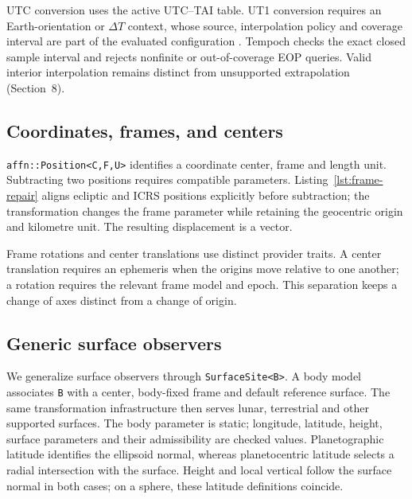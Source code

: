 UTC conversion uses the active UTC--TAI table. UT1 conversion requires an Earth-orientation or
$\Delta T$ context, whose source, interpolation policy and coverage interval are part of the
evaluated configuration \cite{iers2010}. Tempoch checks the exact closed sample interval and
rejects nonfinite or out-of-coverage EOP queries. Valid interior interpolation remains distinct
from unsupported extrapolation (Section~8).

\subsection{Coordinates, frames, and centers}

\texttt{affn::Position<C,F,U>} identifies a coordinate center, frame and length unit. Subtracting
two positions requires compatible parameters. Listing~\ref{lst:frame-repair} aligns ecliptic and
ICRS positions explicitly before subtraction; the transformation changes the frame parameter while
retaining the geocentric origin and kilometre unit. The resulting displacement is a vector.



Frame rotations and center translations use distinct provider traits. A center translation requires
an ephemeris when the origins move relative to one another; a rotation requires the relevant frame
model and epoch. This separation keeps a change of axes distinct from a change of origin.

\subsection{Generic surface observers}
\label{sec:surface}

We generalize surface observers through \texttt{SurfaceSite<B>}. A body model associates \texttt{B}
with a center, body-fixed frame and default reference surface. The same transformation
infrastructure then serves lunar, terrestrial and other supported surfaces. The body parameter is
static; longitude, latitude, height, surface parameters and their admissibility are checked values.
Planetographic latitude identifies the ellipsoid normal, whereas planetocentric latitude selects a
radial intersection with the surface. Height and local vertical follow the surface normal in both
cases; on a sphere, these latitude definitions coincide.

